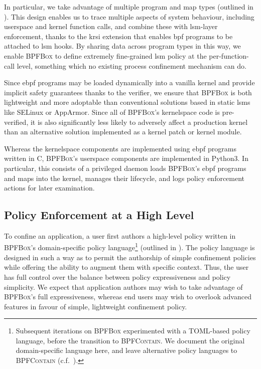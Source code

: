 \documentclass[
  fontsize=12pt,
  titlepage=firstiscover,
  paper=letter,
oneside,
  cleardoublepage=plain,
  parskip=half-,
  DIV=10,
  parindent,
  appendixprefix,
  chapterprefix,
  listof=totoc,
]{scrbook}
\newcommand{\bpfbox}{\textsc{BPFBox}}
\newcommand{\bpfcontain}{\textsc{BPFContain}}
\begin{document}
In particular, we take advantage of multiple program and map types (outlined in
). This design enables us to trace multiple aspects of system
behaviour, including userspace and kernel function calls, and combine these with
\gls{lsm}-layer enforcement, thanks to the \gls{krsi} extension that enables \gls{bpf}
programs to be attached to \gls{lsm} hooks. By sharing data across program types in this
way, we enable \bpfbox{} to define extremely fine-grained \gls{lsm} policy at the
per-function-call level, something which no existing process confinement mechanism can do.

Since \gls{ebpf} programs may be loaded dynamically into a vanilla kernel and provide
implicit safety guarantees thanks to the verifier, we ensure that \bpfbox{} is both
lightweight and more adoptable than conventional solutions based in static \glspl{lsm}
like SELinux or AppArmor. Since all of \bpfbox{}'s kernelspace code is pre-verified, it is
also significantly less likely to adversely affect a production kernel than an alternative
solution implemented as a kernel patch or kernel module.

Whereas the kernelspace components are implemented using \gls{ebpf} programs written in C,
\bpfbox{}'s userspace components are implemented in Python3. In particular, this consists
of a privileged daemon loads \bpfbox{}'s \gls{ebpf} programs and maps into the kernel,
manages their lifecycle, and logs policy enforcement actions for later examination.



\subsection{Policy Enforcement at a High Level}\label{ss:bpfbox-enforcement-overview}

To confine an application, a user first authors a high-level policy written in \bpfbox{}'s
domain-specific policy language\footnote{Subsequent iterations on \bpfbox{} experimented
with a TOML-based policy language, before the transition to \bpfcontain{}. We document the
original domain-specific language here, and leave alternative policy languages to
\bpfcontain{} (c.f.\ ).} (outlined in ). The
policy language is designed in such a way as to permit the authorship of simple
confinement policies while offering the ability to augment them with specific context.
Thus, the user has full control over the balance between policy expressiveness and policy
simplicity. We expect that application authors may wish to take advantage of \bpfbox{}'s
full expressiveness, whereas end users may wish to overlook advanced features in favour of
simple, lightweight confinement policy.
\end{document}
